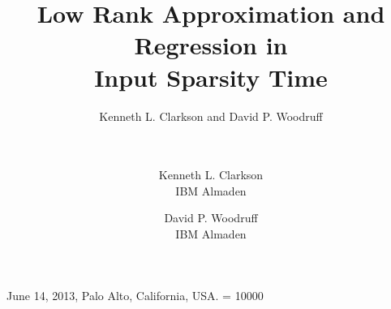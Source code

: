 \documentclass{sig-alternate}
\begin{document}
\ifSTOC
{} {June 14, 2013, Palo Alto, California, USA.}
\widowpenalty = 10000
\fi

\title{Low Rank Approximation and Regression in \\ Input Sparsity Time}
\ifSTOC
{} 
\author{\alignauthor Kenneth L. Clarkson and David P. Woodruff \\
 \\  \\
} 
\else \author{Kenneth L. Clarkson\\IBM Almaden \and David P. Woodruff\\IBM Almaden}
\fi
\maketitle
\end{document}
